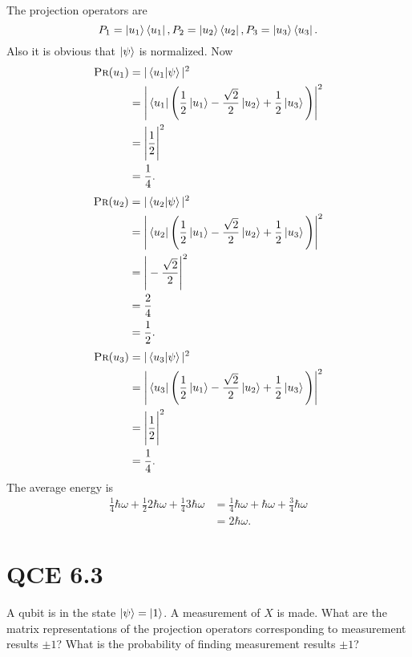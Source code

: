 \documentclass[10pt]{article}
\begin{document}
The projection operators are
\[
P_1 = \ket{u_1} \bra{u_1}, \\
P_2 = \ket{u_2} \bra{u_2}, \\
P_3 = \ket{u_3} \bra{u_3}.
\]
Also it is obvious that $\ket{\psi}$ is normalized. Now
\begin{align*}
\textsc{Pr}(u_1) &= | \braket{u_1 | \psi} |^2 \\
                         &=\Bigg| \bra{u_1} \Bigg( \frac{1}{2} \ket{u_1} - \frac{\sqrt{2}}{2} \ket{u_2} + \frac{1}{2} \ket{u_3} \Bigg) \Bigg|^2 \\
                         &= \Bigg| \frac{1}{2}\Bigg|^2 \\
                         &= \frac{1}{4}.
\end{align*}
\begin{align*}
\textsc{Pr}(u_2) &= | \braket{u_2 | \psi} |^2 \\
                         &=\Bigg| \bra{u_2} \Bigg( \frac{1}{2} \ket{u_1} - \frac{\sqrt{2}}{2} \ket{u_2} + \frac{1}{2} \ket{u_3} \Bigg) \Bigg|^2 \\
                         &= \Bigg| -\frac{\sqrt{2}}{2}\Bigg|^2 \\
                         &= \frac{2}{4} \\
                         &= \frac{1}{2}.
\end{align*}
\begin{align*}
\textsc{Pr}(u_3) &= | \braket{u_3 | \psi} |^2 \\
                         &=\Bigg| \bra{u_3} \Bigg( \frac{1}{2} \ket{u_1} - \frac{\sqrt{2}}{2} \ket{u_2} + \frac{1}{2} \ket{u_3} \Bigg) \Bigg|^2 \\
                         &= \Bigg| \frac{1}{2}\Bigg|^2 \\
                         &= \frac{1}{4}.
\end{align*}
The average energy is
\begin{align*}
\frac{1}{4} \hbar \omega + \frac{1}{2} 2 \hbar \omega+ \frac{1}{4}3\hbar \omega &= \frac{1}{4} \hbar \omega + \hbar \omega + \frac{3}{4} \hbar \omega \\
     &= 2\hbar \omega. 
\end{align*}

\section*{QCE 6.3} A qubit is in the state $\ket{\psi} = \ket{1}$. A measurement of $X$ is made. What are the matrix representations of the projection operators corresponding to measurement results $\pm 1$? What is the probability of finding measurement results $\pm 1$?
\end{document}
